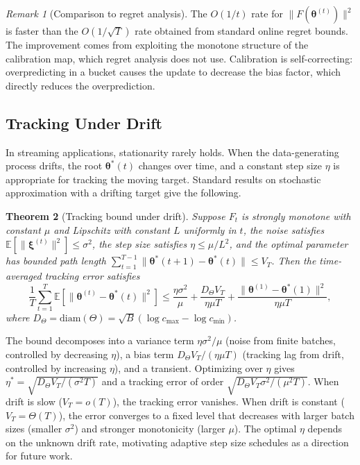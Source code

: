 \documentclass[12pt, letterpaper]{article}
\newtheorem{theorem}{Theorem}[section]
\theoremstyle{definition}
\theoremstyle{remark}
\newtheorem{remark}[theorem]{Remark}
\begin{document}
\begin{remark}[Comparison to regret analysis]
The $O(1/t)$ rate for $\|F(\boldsymbol{\theta}^{(t)})\|^2$ is faster than the $O(1/\sqrt{T})$ rate obtained from standard online regret bounds. The improvement comes from exploiting the monotone structure of the calibration map, which regret analysis does not use. Calibration is self-correcting: overpredicting in a bucket causes the update to decrease the bias factor, which directly reduces the overprediction.
\end{remark}

\subsection{Tracking Under Drift}
\label{sec:tracking}

In streaming applications, stationarity rarely holds. When the data-generating process drifts, the root $\boldsymbol{\theta}^*(t)$ changes over time, and a constant step size $\eta$ is appropriate for tracking the moving target. Standard results on stochastic approximation with a drifting target \citep[Chapter~2]{benveniste2012adaptive} give the following.

\begin{theorem}[Tracking bound under drift]
\label{thm:tracking}
Suppose $F_t$ is strongly monotone with constant $\mu$ and Lipschitz with constant $L$ uniformly in $t$, the noise satisfies $\mathbb{E}[\|\boldsymbol{\xi}^{(t)}\|^2] \le \sigma^2$, the step size satisfies $\eta \le \mu/L^2$, and the optimal parameter has bounded path length $\sum_{t=1}^{T-1} \|\boldsymbol{\theta}^*(t+1) - \boldsymbol{\theta}^*(t)\| \le V_T$. Then the time-averaged tracking error satisfies
\[
\frac{1}{T}\sum_{t=1}^T \mathbb{E}\!\left[\|\boldsymbol{\theta}^{(t)} - \boldsymbol{\theta}^*(t)\|^2\right] \le \frac{\eta \sigma^2}{\mu} + \frac{D_\Theta V_T}{\eta \mu T} + \frac{\|\boldsymbol{\theta}^{(1)} - \boldsymbol{\theta}^*(1)\|^2}{\eta \mu T},
\]
where $D_\Theta = \mathrm{diam}(\Theta) = \sqrt{B}(\log c_{\max} - \log c_{\min})$.
\end{theorem}

The bound decomposes into a variance term $\eta\sigma^2/\mu$ (noise from finite batches, controlled by decreasing $\eta$), a bias term $D_\Theta V_T/(\eta\mu T)$ (tracking lag from drift, controlled by increasing $\eta$), and a transient. Optimizing over $\eta$ gives $\eta^* = \sqrt{D_\Theta V_T/(\sigma^2 T)}$ and a tracking error of order $\sqrt{D_\Theta V_T \sigma^2/(\mu^2 T)}$. When drift is slow ($V_T = o(T)$), the tracking error vanishes. When drift is constant ($V_T = \Theta(T)$), the error converges to a fixed level that decreases with larger batch sizes (smaller $\sigma^2$) and stronger monotonicity (larger $\mu$). The optimal $\eta$ depends on the unknown drift rate, motivating adaptive step size schedules as a direction for future work.
\end{document}
